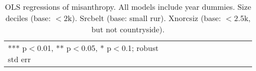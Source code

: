 \documentclass[11pt, letterpaper]{article}
\begin{document}
\begin{spacing}{1.4}
 \begin{spacing}{.67}
   \begin{table}[H]\centering
     \caption{OLS regressions  of misanthropy. All models include year
       dummies. Size deciles (base: $<$2k). Srcbelt (base: small rur). Xnorcsiz (base: $<$2.5k, but not countryside).} \label{regE}
     \begin{tiny} \begin{tabular}{p{1.2in}p{.45in}p{.45in}p{.45in}p{.45in}p{.45in}p{.45in}p{.45in}p{.45in}p{.45in}p{.45 in}}\hline
         
         \hline  *** p$<$0.01, ** p$<$0.05, * p$<$0.1; robust std err
       \end{tabular}\end{tiny}\end{table}
 \end{spacing}



 
\end{spacing}
\end{document}
